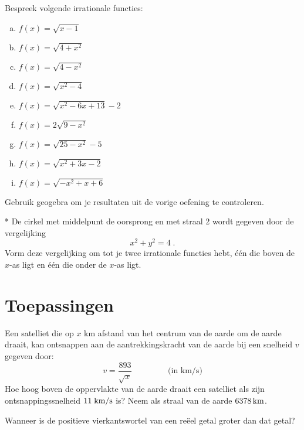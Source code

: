 \documentclass[12pt,twoside]{article}
\begin{document}
\begin{oefening}
Bespreek volgende irrationale functies:
\begin{enumerate}[(a)]
  \item $f(x)=\sqrt{x-1}$
  \item $f(x)=\sqrt{4+x^2}$
  \item $f(x)=\sqrt{4-x^2}$
  \item $f(x)=\sqrt{x^2-4}$
  \item $f(x)=\sqrt{x^2-6x+13}-2$
  \item $f(x)=2\sqrt{9-x^2}$
  \item $f(x)=\sqrt{25-x^2}-5$
  \item $f(x)=\sqrt{x^2+3x-2}$
  \item $f(x)=\sqrt{-x^2+x+6}$
\end{enumerate}
\end{oefening}

\begin{oefening}
Gebruik geogebra om je resultaten uit de vorige oefening te controleren.
\end{oefening}

\begin{oefening}*
De cirkel met middelpunt de oorsprong en met straal 2 wordt gegeven door de vergelijking
$$x^2+y^2=4\;.$$
Vorm deze vergelijking om tot je twee irrationale functies hebt, één die boven de $x$-as ligt en één die onder de $x$-as ligt.
\end{oefening}

\pagebreak
\section{Toepassingen}

\begin{oefening} %
Een satelliet die op $x$ km afstand van het centrum van de aarde om de aarde draait, kan ontsnappen aan de aantrekkingskracht van de aarde bij een snelheid $v$ gegeven door:
$$v=\dfrac{893}{\sqrt{x}}\qquad\qquad\mbox{ (in km/s)}$$
Hoe hoog boven de oppervlakte van de aarde draait een satelliet als zijn ontsnappingssnelheid $11 \;\mbox{km/s}$ is? Neem als straal van de aarde $6378 \km$.
\end{oefening}

\begin{oefening} %
Wanneer is de positieve vierkantswortel van een reëel getal groter dan dat getal?
\end{oefening}
\end{document}
